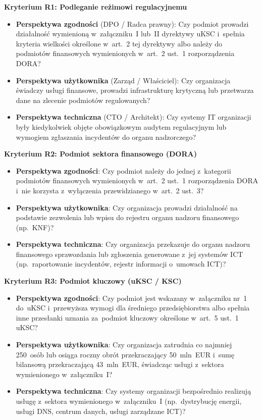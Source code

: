 \noindent\textbf{Kryterium R1: Podleganie reżimowi regulacyjnemu}

\begin{itemize}
  \item \textbf{Perspektywa zgodności} (DPO / Radca prawny): Czy podmiot prowadzi działalność wymienioną w~załączniku~I lub~II dyrektywy uKSC i~spełnia kryteria wielkości określone w~art.~2 tej dyrektywy albo należy do podmiotów finansowych wymienionych w~art.~2 ust.~1 rozporządzenia DORA?
  \item \textbf{Perspektywa użytkownika} (Zarząd / Właściciel): Czy organizacja świadczy usługi finansowe, prowadzi infrastrukturę krytyczną lub przetwarza dane na zlecenie podmiotów regulowanych?
  \item \textbf{Perspektywa techniczna} (CTO / Architekt): Czy systemy IT organizacji były kiedykolwiek objęte obowiązkowym audytem regulacyjnym lub wymogiem zgłaszania incydentów do organu nadzorczego?
\end{itemize}

\noindent\textbf{Kryterium R2: Podmiot sektora finansowego (DORA)}

\begin{itemize}
  \item \textbf{Perspektywa zgodności}: Czy podmiot należy do jednej z~kategorii podmiotów finansowych wymienionych w~art.~2 ust.~1 rozporządzenia DORA i~nie korzysta z~wyłączenia przewidzianego w~art.~2 ust.~3?
  \item \textbf{Perspektywa użytkownika}: Czy organizacja prowadzi działalność na podstawie zezwolenia lub wpisu do rejestru organu nadzoru finansowego (np.\ KNF)?
  \item \textbf{Perspektywa techniczna}: Czy organizacja przekazuje do organu nadzoru finansowego sprawozdania lub zgłoszenia generowane z~jej systemów ICT (np.\ raportowanie incydentów, rejestr informacji o~umowach ICT)?
\end{itemize}

\noindent\textbf{Kryterium R3: Podmiot kluczowy (uKSC / KSC)}

\begin{itemize}
\item \textbf{Perspektywa zgodności}: Czy podmiot jest wskazany
w~załączniku nr~1 do~uKSC i~przewyższa wymogi dla średniego
przedsiębiorstwa albo spełnia inne przesłanki uznania
za~podmiot kluczowy określone w~art.~5 ust.~1 uKSC?
  \item \textbf{Perspektywa użytkownika}: Czy organizacja zatrudnia co najmniej 250~osób lub osiąga roczny obrót przekraczający 50~mln~EUR i~sumę bilansową przekraczającą 43~mln~EUR, świadcząc usługi z~sektora wymienionego w~załączniku~I?
  \item \textbf{Perspektywa techniczna}: Czy systemy organizacji bezpośrednio realizują usługę z~sektora wymienionego w~załączniku~I (np.\ dystrybucję energii, usługi DNS, centrum danych, usługi zarządzane ICT)?
\end{itemize}

